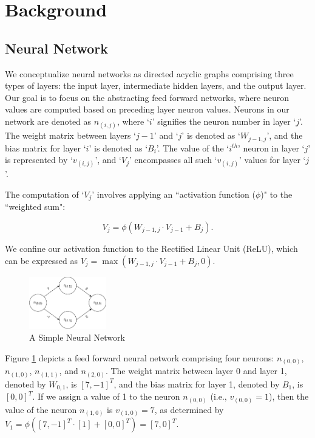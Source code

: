 \section{Background}
\subsection{Neural Network}
We conceptualize neural networks as directed acyclic graphs 
comprising three types of layers: the input layer, intermediate hidden layers, 
and the output layer. Our goal is to focus on the abstracting feed forward networks, 
where neuron values are computed based on preceding layer neuron values. 
Neurons in our network are denoted as $n_{(i,j)}$, where `$i$' signifies the 
neuron number in layer `$j$'. The weight matrix between layers `${j-1}$' and `$j$' 
is denoted as `$W_{{j-1}, j}$', and the bias matrix for layer `$i$' is denoted as 
`$B_{i}$'. The value of the `$i^{th}$' neuron in layer `$j$' is represented by 
`$v_{(i,j)}$', and `$V_{j}$' encompasses all such `$v_{(i,j)}$' values for layer 
`$j$'.

The computation of `$V_{j}$' involves applying an ``activation function ($\phi$)" 
to the ``weighted sum":

\[V_{j} = \phi(W_{{j-1}, j} \cdot V_{j-1} + B_{j}).\] 

We confine our activation function to the Rectified Linear Unit (ReLU), 
which can be expressed as $V_{j} = \max(W_{j-1, j} \cdot V_{j-1} + B_{j}, 0)$.


\begin{figure}[H]
    \centering
    \includegraphics[width=0.3\textwidth, height = 0.15\textwidth]{diagrams/Basic_Neural_Network.pdf}
    \caption{A Simple Neural Network}
    \label{Figure: Simple Neurla}

\end{figure} 

Figure \ref{Figure: Simple Neurla} depicts a feed forward neural network 
comprising four neurons: $n_{(0, 0)}$, $n_{(1, 0)}$, $n_{(1, 1)}$, and $n_{(2, 0)}$. 
The weight matrix between layer 0 and layer 1, denoted by $W_{0,1}$, 
is $[7, -1]^T$, and the bias matrix for layer 1, denoted by $B_{1}$, 
is $[0, 0]^T$. If we assign a value of 1 to the neuron $n_{(0, 0)}$ 
(i.e., $v_{(0, 0)}=1$), then the value of the neuron $n_{(1,0)}$ is $v_{(1,0)}=7$, 
as determined by $V_{1} = \phi([7, -1]^{T} \cdot [1] + [0, 0]^{T}) = [7, 0]^{T}$.


